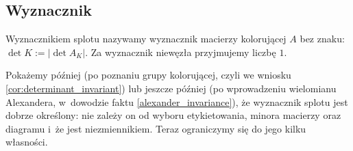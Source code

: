 
\subsection{Wyznacznik}
\begin{definition}[wyznacznik]
\label{def:determinant}%
    Wyznacznikiem splotu nazywamy wyznacznik macierzy kolorującej $A$ bez znaku: $\det K := |\det A_K|$.
    Za wyznacznik niewęzła przyjmujemy liczbę $1$.
\end{definition}

Pokażemy później (po poznaniu grupy kolorującej, czyli we wniosku \ref{cor:determinant_invariant}) lub jeszcze później (po wprowadzeniu wielomianu Alexandera, w~dowodzie faktu \ref{alexander_invariance}), że wyznacznik splotu jest dobrze określony: nie zależy on od wyboru etykietowania, minora macierzy oraz diagramu i~że jest niezmiennikiem.
Teraz ograniczymy się do jego kilku własności.





